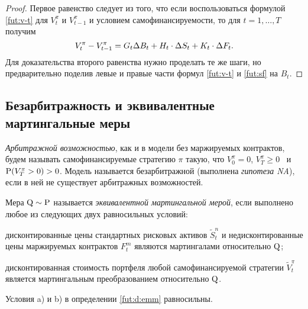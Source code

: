 \begin{proof}
Первое равенство следует из того, что если воспользоваться формулой \eqref{fut:v-t} для $V_t^\pi$ и $V_{t-1}^\pi$ и условием самофинансируемости, то для $t=1,\dots,T$ получим
\[
V_t^\pi - V_{t-1}^\pi = G_t\Delta B_t + \scal{H_t}{\Delta S_t} + \scal{K_t}\Delta F_t.
\]
Для доказательства второго равенства нужно проделать те же шаги, но предварительно поделив левые и правые части формул \eqref{fut:v-t} и \eqref{fut:sf} на $B_t$.
\end{proof}


\subsection{Безарбитражность и эквивалентные мартингальные меры}

\emph{Арбитражной возможностью}, как и в модели без маржируемых контрактов, будем называть самофинансируемые стратегию $\pi$ такую, что $V_0^\pi=0$, $V_T^\pi \ge 0$ \as\ и $\P(V_T^\pi>0)>0$. 
Модель называется безарбитражной (выполнена \emph{гипотеза NA}), если в ней не существует арбитражных возможностей. 

\begin{definition}
\label{fut:d:emm}
Мера $\Q\sim\P$ называется \emph{эквивалентной мартингальной мерой}, если выполнено любое из следующих двух равносильных условий:
\begin{alphenum}
\item дисконтированные цены стандартных рисковых активов $\tilde S_t^n$ и недисконтированные цены маржируемых контрактов $F_t^m$ являются мартингалами относительно $\Q$;
\item дисконтированная стоимость портфеля любой самофинансируемой стратегии $\tilde V_t^\pi$ является мартингальным преобразованием относительно $\Q$.
\end{alphenum}
\end{definition}

\begin{proposition}
Условия a) и  b) в определении \ref{fut:d:emm} равносильны.
\end{proposition}

